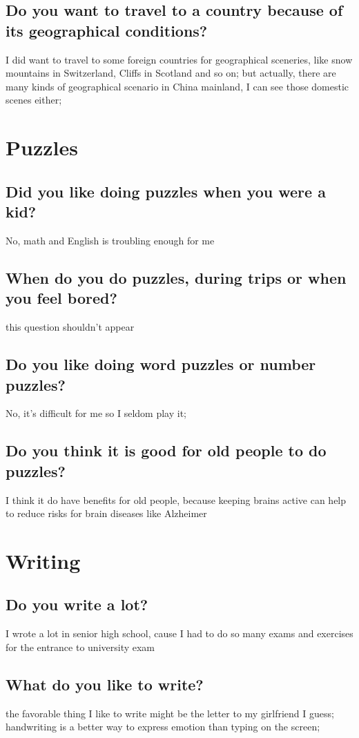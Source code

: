 \documentclass[conference]{IEEEtran}
\begin{document}
\subsection{Do you want to travel to a country because of its
geographical conditions?}
I did want to travel to some foreign countries for geographical sceneries, like
snow mountains in Switzerland, Cliffs in Scotland and so on;
but actually, there are many kinds of geographical scenario in China mainland,
I can see those domestic scenes either;

\section{Puzzles}
\subsection{Did you like doing puzzles when you were a kid?}
No, math and English is troubling enough for me
\subsection{When do you do puzzles, during trips or when you feel bored?}
this question shouldn't appear
\subsection{Do you like doing word puzzles or number puzzles?}
No, it's difficult for me so I seldom play it;
\subsection{Do you think it is good for old people to do puzzles?}
I think it do have benefits for old people, because keeping brains active 
can help to reduce risks for brain diseases like Alzheimer

\section{Writing}
\subsection{Do you write a lot?}
I wrote a lot in senior high school, cause I had to do so many exams and 
exercises for the entrance to university exam
\subsection{What do you like to write?}
the favorable thing I like to write might be the letter to my girlfriend I guess;
handwriting is a better way to express emotion than typing on the screen;
\end{document}

